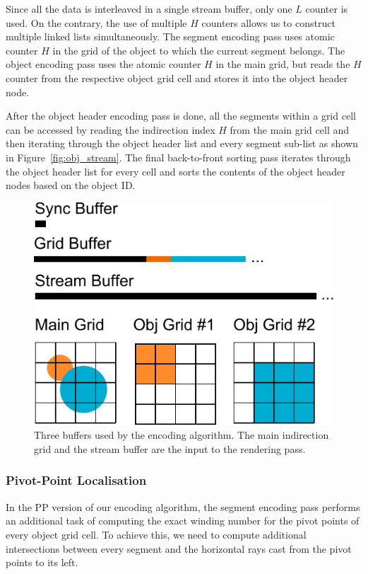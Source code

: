 \documentclass[11pt,a4paper,twoside]{article}
\begin{document}
Since all the data is interleaved in a single stream buffer, only one $L$ counter is used. On the contrary, the use of multiple $H$ counters allows us to construct multiple linked lists simultaneously. The segment encoding pass uses atomic counter $H$ in the grid of the object to which the current segment belongs. The object encoding pass uses the atomic counter $H$ in the main grid, but reads the $H$ counter from the respective object grid cell and stores it into the object header node.

After the object header encoding pass is done, all the segments within a grid cell can be accessed by reading the indirection index $H$ from the main grid cell and then iterating through the object header list and every segment sub-list as shown in Figure~\ref{fig:obj_stream}. The final back-to-front sorting pass iterates through the object header list for every cell and sorts the contents of the object header nodes based on the object ID.

\begin {figure}
	\centering
	\includegraphics[width=0.5\columnwidth] {figures/data_buffers}
	\caption {Three buffers used by the encoding algorithm. The main indirection grid and the stream buffer are the input to the rendering pass.}
	\label {fig:data_buffers}
\end {figure}


\subsubsection {Pivot-Point Localisation}

In the PP version of our encoding algorithm, the segment encoding pass performs an additional task of computing the exact winding number for the pivot points of every object grid cell. To achieve this, we need to compute additional intersections between every segment and the horizontal rays cast from the pivot points to its left.
\end{document}

